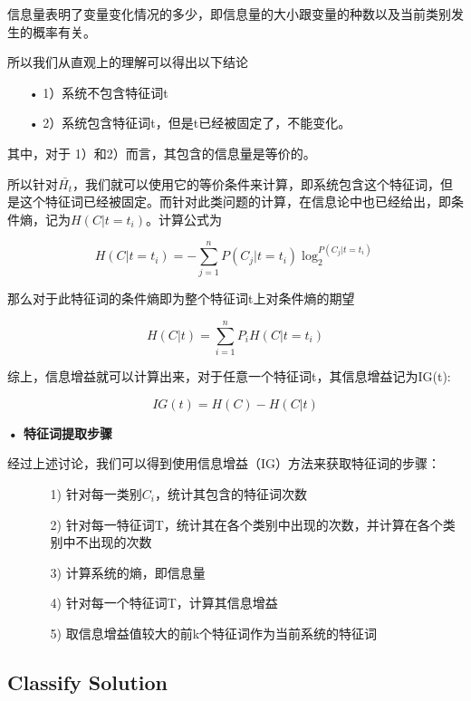 \documentclass[a4paper,11pt,twoside,openany]{article}
\begin{document}
\begin{CJK*}{UTF8}{gbsn}
	信息量表明了变量变化情况的多少，即信息量的大小跟变量的种数以及当前类别发生的概率有关。
	
	所以我们从直观上的理解可以得出以下结论
	\begin{enumerate}
		\item[•] 1）系统不包含特征词t
		\item[•] 2）系统包含特征词t，但是t已经被固定了，不能变化。
	\end{enumerate}
其中，对于 1）和2）而言，其包含的信息量是等价的。

所以针对$\bar{H_t}$，我们就可以使用它的等价条件来计算，即系统包含这个特征词，但是这个特征词已经被固定。而针对此类问题的计算，在信息论中也已经给出，即条件熵，记为$H(C|t=t_i)$。计算公式为

\begin{equation}
	H(C|t=t_i) = - \sum_{j=1}^n P(C_j|t=t_i)\log_2^{P(C_j|t=t_i)}
\end{equation}

那么对于此特征词的条件熵即为整个特征词t上对条件熵的期望

\begin{equation}
	H(C|t) = \sum_{i=1}^n P_i H(C|t = t_i)
\end{equation}

综上，信息增益就可以计算出来，对于任意一个特征词t，其信息增益记为IG(t):

\begin{equation}\label{IG}
	IG(t) = H(C) - H(C|t) 
\end{equation}

\textbf{• 特征词提取步骤}

经过上述讨论，我们可以得到使用信息增益（IG）方法来获取特征词的步骤：
\begin{enumerate}
\item[]
\begin{enumerate}
\item[1)] 针对每一类别$C_i$，统计其包含的特征词次数
\item[2)] 针对每一特征词T，统计其在各个类别中出现的次数，并计算在各个类别中不出现的次数
\item[3)] 计算系统的熵，即信息量
\item[4)] 针对每一个特征词T，计算其信息增益
\item[5)] 取信息增益值较大的前k个特征词作为当前系统的特征词
\end{enumerate}
\end{enumerate}


\subsection{Classify Solution}

\end{CJK*}
\end{document}
